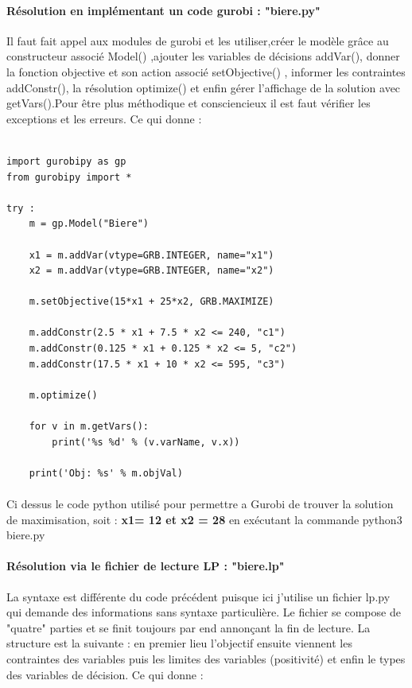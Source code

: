\documentclass[a4paper, 12pt, twoside]{article}
\begin{document}
\paragraph{Résolution en implémentant un code gurobi : "biere.py"}{Il faut fait appel aux modules de \textsf{gurobi} et les utiliser,créer le modèle grâce au constructeur associé \textsf{Model()} ,ajouter les variables de décisions \textsf{addVar()}, donner la fonction objective et son action associé \textsf{setObjective()} , informer les contraintes \textsf{addConstr()}, la résolution \textsf{optimize()} et enfin gérer l'affichage de la solution avec \textsf{getVars()}.Pour être plus méthodique et consciencieux  il est faut vérifier les exceptions et les erreurs. Ce qui  donne :}
\begin{verbatim}

import gurobipy as gp
from gurobipy import *

try : 
    m = gp.Model("Biere")

    x1 = m.addVar(vtype=GRB.INTEGER, name="x1")
    x2 = m.addVar(vtype=GRB.INTEGER, name="x2")
   
    m.setObjective(15*x1 + 25*x2, GRB.MAXIMIZE)
    
    m.addConstr(2.5 * x1 + 7.5 * x2 <= 240, "c1")
    m.addConstr(0.125 * x1 + 0.125 * x2 <= 5, "c2")
    m.addConstr(17.5 * x1 + 10 * x2 <= 595, "c3")
    
    m.optimize()

    for v in m.getVars():
        print('%s %d' % (v.varName, v.x))

    print('Obj: %s' % m.objVal)
\end{verbatim}


\paragraph*{}{Ci dessus le code python utilisé pour permettre a \textsf{Gurobi} de trouver la solution de maximisation, soit  : \textbf{x1= 12 et x2 = 28} en exécutant la commande \textsf{python3 biere.py}}

\paragraph{Résolution via le fichier de lecture LP : "biere.lp"}{La syntaxe est différente du code précédent puisque ici j'utilise un fichier \textsf{lp.py} qui demande des informations sans syntaxe particulière. Le fichier se compose de "quatre" parties et se finit toujours par \textsf{end} annonçant la fin de lecture. La structure est la suivante : en premier lieu l'objectif ensuite viennent les contraintes des variables puis les limites des variables (positivité) et enfin le types des variables de décision. Ce qui donne :}
\end{document}
